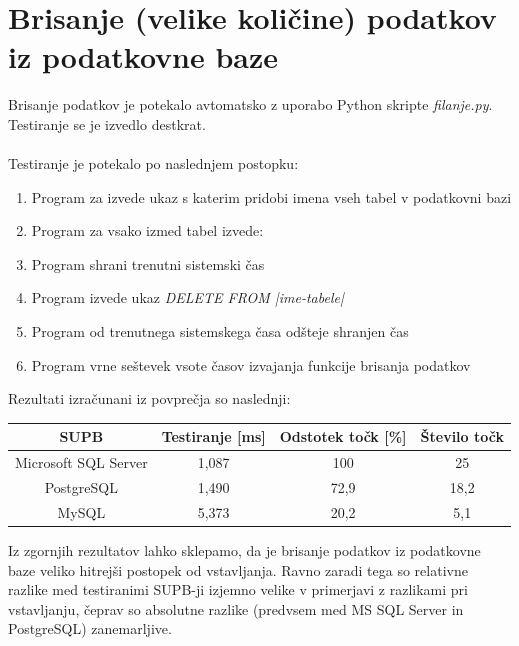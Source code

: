 \documentclass[a4paper,11pt]{report}
\begin{document}
\section{Brisanje (velike količine) podatkov iz podatkovne baze}
Brisanje podatkov je potekalo avtomatsko z uporabo Python skripte \textit{filanje.py}. Testiranje se je izvedlo destkrat.
\\\\

Testiranje je potekalo po naslednjem postopku:
\begin{enumerate}
   \item Program za izvede ukaz s katerim pridobi imena vseh tabel v podatkovni bazi
   \item Program za vsako izmed tabel izvede:
      \item Program shrani trenutni sistemski čas
      \item Program izvede ukaz \textit{DELETE FROM |ime-tabele|}
      \item Program od trenutnega sistemskega časa odšteje shranjen čas
   \item Program vrne seštevek vsote časov izvajanja funkcije brisanja podatkov
\end{enumerate}

Rezultati izračunani iz povprečja so naslednji:
\begin{center}
   \begin{tabular}{||c|c|c|c||}
      \hline
      \textbf{SUPB} & \textbf{Testiranje [ms]} & \textbf{Odstotek točk [\%] } & \textbf{Število točk}\\
      \hline
      \hline
      Microsoft SQL Server & 1,087 & 100 & 25\\
      PostgreSQL & 1,490 & 72,9 & 18,2\\
      MySQL & 5,373 & 20,2 & 5,1\\
      \hline
   \end{tabular}
\end{center}

Iz zgornjih rezultatov lahko sklepamo, da je brisanje podatkov iz podatkovne baze veliko hitrejši postopek od vstavljanja.
Ravno zaradi tega so relativne razlike med testiranimi SUPB-ji izjemno velike v primerjavi z razlikami pri vstavljanju, čeprav
so absolutne razlike (predvsem med MS SQL Server in PostgreSQL) zanemarljive.
\end{document}
